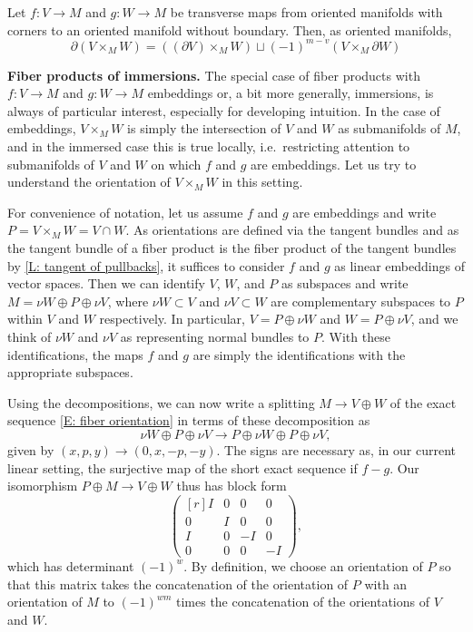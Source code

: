 \begin{proposition}\label{P: oriented fiber boundary}
	Let $f:V\to M$ and $g:W\to M$ be transverse maps from oriented manifolds with corners to an oriented manifold without boundary.
	Then, as oriented manifolds,
	\begin{equation*}
		\partial (V \times_M W) = ((\partial V )\times_M W )\sqcup (-1)^{m-v}(V \times_M \partial W)
	\end{equation*}
\end{proposition}

\medskip

\noindent\textbf{Fiber products of immersions.}
The special case of fiber products with $f:V\to M$ and $g:W\to M$ embeddings or, a bit more generally, immersions, is always of particular interest, especially for developing intuition.
In the case of embeddings, $V\times_MW$ is simply the intersection of $V$ and $W$ as submanifolds of $M$, and in the immersed case this is true locally, i.e.\ restricting attention to submanifolds of $V$ and $W$ on which $f$ and $g$ are embeddings.
Let us try to understand the orientation of $V\times_MW$ in this setting.

For convenience of notation, let us assume $f$ and $g$ are embeddings and write $P=V\times_MW=V\cap W$.
As orientations are defined via the tangent bundles and as the tangent bundle of a fiber product is the fiber product of the tangent bundles by \cref{L: tangent of pullbacks}, it suffices to consider $f$ and $g$ as linear embeddings of vector spaces.
Then we can identify $V$, $W$, and $P$ as subspaces and write $M=\nu W\oplus P \oplus \nu V$, where $\nu W\subset V$ and $\nu V\subset W$ are complementary subspaces to $P$ within $V$ and $W$ respectively.
In particular, $V=P\oplus \nu W$ and $W=P\oplus \nu V$, and we think of $\nu W$ and $\nu V$ as representing normal bundles to $P$.
With these identifications, the maps $f$ and $g$ are simply the identifications with the appropriate subspaces.

Using the decompositions, we can now write a splitting $M\to V\oplus W$ of the exact sequence \eqref{E: fiber orientation} in terms of these decomposition as $$\nu W\oplus P \oplus \nu V\to P\oplus \nu W\oplus P\oplus \nu V,$$ given by $(x,p,y)\to (0,x, -p, -y)$.
The signs are necessary as, in our current linear setting, the surjective map of the short exact sequence if $f-g$.
Our isomorphism $P\oplus M\to V\oplus W$ thus has block form
$$\begin{pmatrix*}[r]
	I&0&0&0\\
	0&I&0&0\\
	I&0&-I&0\\
	0&0&0&-I
\end{pmatrix*},$$
which has determinant $(-1)^{w}$.
By definition, we choose an orientation of $P$ so that this matrix takes the concatenation of the orientation of $P$ with an orientation of $M$ to $(-1)^{wm}$ times the concatenation of the orientations of $V$ and $W$.

